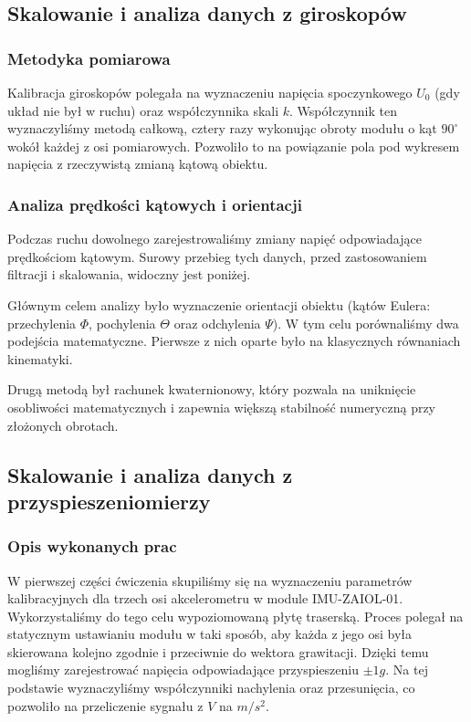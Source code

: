 \subsection{Skalowanie i analiza danych z giroskopów}

\subsubsection{Metodyka pomiarowa}
\akapit Kalibracja giroskopów polegała na wyznaczeniu napięcia spoczynkowego $U_{0}$ (gdy układ nie był w ruchu) oraz współczynnika skali $k$. Współczynnik ten wyznaczyliśmy metodą całkową, cztery razy wykonując obroty modułu o kąt $90^{\circ}$ wokół każdej z osi pomiarowych. Pozwoliło to na powiązanie pola pod wykresem napięcia z rzeczywistą zmianą kątową obiektu.

\subsubsection{Analiza prędkości kątowych i orientacji}
\akapit Podczas ruchu dowolnego zarejestrowaliśmy zmiany napięć odpowiadające prędkościom kątowym. Surowy przebieg tych danych, przed zastosowaniem filtracji i skalowania, widoczny jest poniżej.


\akapit Głównym celem analizy było wyznaczenie orientacji obiektu (kątów Eulera: przechylenia $\Phi$, pochylenia $\Theta$ oraz odchylenia $\Psi$). W tym celu porównaliśmy dwa podejścia matematyczne. Pierwsze z nich oparte było na klasycznych równaniach kinematyki.

\akapit Drugą metodą był rachunek kwaternionowy, który pozwala na uniknięcie osobliwości matematycznych i zapewnia większą stabilność numeryczną przy złożonych obrotach.

\subsection{Skalowanie i analiza danych z przyspieszeniomierzy}

\subsubsection{Opis wykonanych prac}
\akapit W pierwszej części ćwiczenia skupiliśmy się na wyznaczeniu parametrów kalibracyjnych dla trzech osi akcelerometru w module IMU-ZAIOL-01. Wykorzystaliśmy do tego celu wypoziomowaną płytę traserską. Proces polegał na statycznym ustawianiu modułu w taki sposób, aby każda z jego osi była skierowana kolejno zgodnie i przeciwnie do wektora grawitacji. Dzięki temu mogliśmy zarejestrować napięcia odpowiadające przyspieszeniu $\pm 1g$. Na tej podstawie wyznaczyliśmy współczynniki nachylenia oraz przesunięcia, co pozwoliło na przeliczenie sygnału z $V$ na $m/s^2$.

